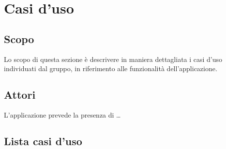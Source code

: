 
\setcounter{secnumdepth}{5} %


\section{Casi d'uso}
\label{sec:casi_uso}

\subsection{Scopo}

Lo scopo di questa sezione è descrivere in maniera dettagliata i casi d’uso individuati dal
gruppo, in riferimento alle funzionalità dell’applicazione.


\subsection{Attori}

L’applicazione prevede la presenza di \dots


\subsection{Lista casi d'uso}





